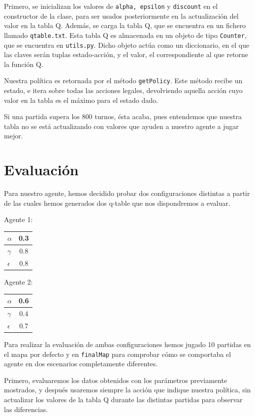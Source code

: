 \documentclass[12pt]{article}
\begin{document}
Primero, se inicializan los valores de \texttt{alpha, epsilon} y \texttt{discount} en el constructor de la clase, para ser usados posteriormente en la actualización del valor en la tabla Q. Además, se carga la tabla Q, que se encuentra en un fichero llamado \texttt{qtable.txt}. Esta tabla Q es almacenada en un objeto de tipo \texttt{Counter}, que se encuentra en \texttt{utils.py}. Dicho objeto actúa como un diccionario, en el que las claves serán tuplas estado-acción, y el valor, el correspondiente al que retorne la función Q.

Nuestra política es retornada por el método \texttt{getPolicy}. Este método recibe un estado, e itera sobre todas las acciones legales, devolviendo aquella acción cuyo valor en la tabla es el máximo para el estado dado.

Si una partida supera los 800 turnos, ésta acaba, pues entendemos que nuestra tabla no se está actualizando con valores que ayuden a nuestro agente a jugar mejor.

\section{Evaluación}

Para nuestro agente, hemos decidido probar dos configuraciones distintas a partir de las cuales hemos generados dos q-table que nos dispondremos a evaluar.

Agente 1:
\begin{tabular}{ l | c}
	\hline
	$\alpha$	& 0.3 \\ \hline
	$\gamma$		& 0.8 \\ \hline
	$\epsilon$	& 0.8 \\ 
	\hline
\end{tabular}

Agente 2:
\begin{tabular}{ l | c}
	\hline
	$\alpha$	& 0.6 \\ \hline
	$\gamma$		& 0.4 \\ \hline
	$\epsilon$	& 0.7 \\ 
	\hline
\end{tabular}

Para realizar la evaluación de ambas configuraciones hemos jugado 10 partidas en el mapa por defecto y en \texttt{finalMap} para comprobar cómo se comportaba el agente en dos escenarios completamente diferentes.

Primero, evaluaremos los datos obtenidos con los parámetros previamente mostrados, y después usaremos siempre la acción que indique nuestra política, sin actualizar los valores de la tabla Q durante las distintas partidas para observar las diferencias.
\end{document}
